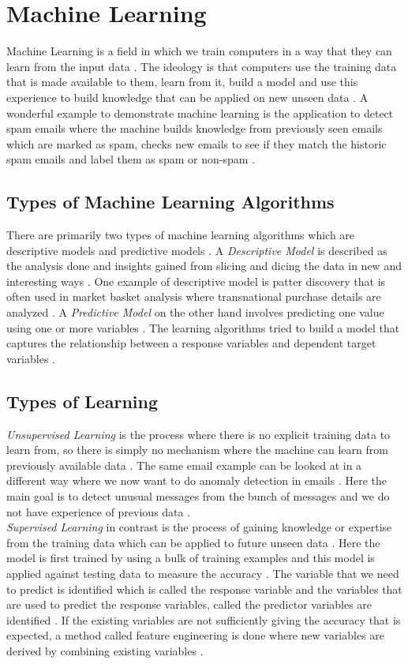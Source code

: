 \documentclass[sigconf]{acmart}
\begin{document}
\section{Machine Learning}
Machine Learning is a field in which we train computers in a way that they can learn from the input data \cite{book-shai}. The ideology is that computers use the training data that is made available to them, learn from it, build a model and use this experience to build knowledge that can be applied on new unseen data \cite{book-shai}. A wonderful example to demonstrate machine learning is the application to detect spam emails where the machine builds knowledge from previously seen emails which are marked as spam, checks new emails to see if they match the historic spam emails and label them as spam or non-spam \cite{book-shai}. 

\subsection{Types of Machine Learning Algorithms}
There are primarily two types of machine learning algorithms which are descriptive models and predictive models \cite{book-shai}. A {\em Descriptive Model} is described as the analysis done and insights gained from slicing and dicing the data in new and interesting ways \cite{book-shai}. One example of descriptive model is patter discovery that is often used in market basket analysis where transnational purchase details are analyzed \cite{book-shai}. A {\em Predictive Model} on the other hand involves predicting one value using one or more variables \cite{book-shai}. The learning algorithms tried to build a model that captures the relationship between a response variables and dependent target variables \cite{book-tan}.

\subsection{Types of Learning}
{\em Unsupervised Learning} is the process where there is no explicit training data to learn from, so there is simply no mechanism where the machine can learn from previously available data \cite{book-shai}. The same email example can be looked at in a different way where we now want to do anomaly detection in emails \cite{book-shai}. Here the main goal is to detect unusual messages from the bunch of messages and we do not have experience of previous data \cite{book-shai}. \\

{\em Supervised Learning} in contrast is the process of gaining knowledge or expertise from the training data which can be applied to future unseen data \cite{book-shai}. Here the model is first trained by using a bulk of training examples and this model is applied against testing data to measure the accuracy \cite{book-shai}. The variable that we need to predict is identified which is called the response variable and the variables that are used to predict the response variables, called the predictor variables are identified \cite{book-shai}. If the existing variables are not sufficiently giving the accuracy that is expected, a method called feature engineering is done where new variables are derived by combining existing variables \cite{book-shai}. 
\end{document}
